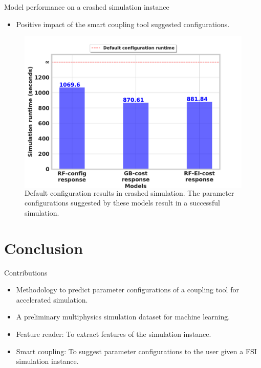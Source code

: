 \documentclass[10pt]{beamer}
\begin{document}
\begin{frame}[t]{Model performance on a crashed simulation instance}

\begin{itemize}
\item Positive impact of the smart coupling tool suggested configurations.
\end{itemize}
\begin{figure}
  \begin{columns}
    \includegraphics[width=\linewidth, height=0.58\textheight]{images/real-eval-new.pdf}
    \caption{Default configuration results in crashed simulation. The parameter configurations suggested by these models result in a successful simulation.}
  \end{columns}
\end{figure}
\end{frame}

\section{Conclusion}

\begin{frame}[t]{Contributions}

\begin{itemize}
\item Methodology to predict parameter configurations of a coupling tool for accelerated simulation.
\newline
\item A preliminary multiphysics simulation dataset for machine learning.
\newline
\item Feature reader: To extract features of the simulation instance.
\newline
\item Smart coupling: To suggest parameter configurations to the user given a FSI simulation instance. 
\end{itemize}{}
\end{frame}
\end{document}
